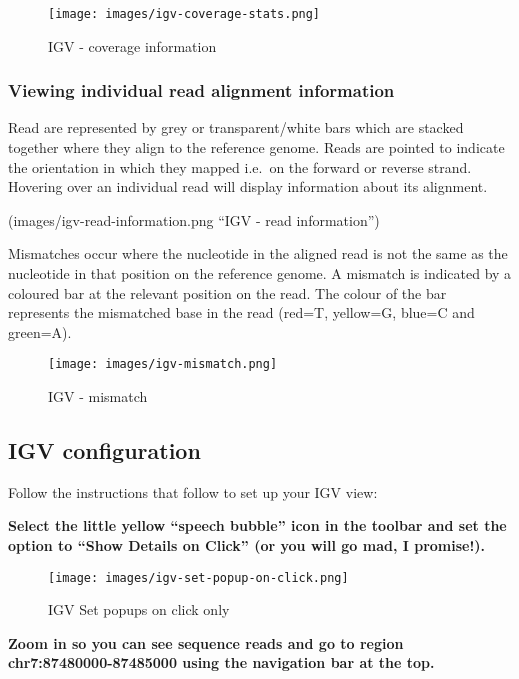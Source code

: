 \documentclass[11pt]{article}
\begin{document}
    \begin{figure}
\centering
\texttt{[image: images/igv-coverage-stats.png]}
\caption{IGV - coverage information}
\end{figure}

    \hypertarget{viewing-individual-read-alignment-information}{%
\subsubsection{Viewing individual read alignment
information}\label{viewing-individual-read-alignment-information}}

Read are represented by grey or transparent/white bars which are stacked
together where they align to the reference genome. Reads are pointed to
indicate the orientation in which they mapped i.e.~on the forward or
reverse strand. Hovering over an individual read will display
information about its alignment.

(images/igv-read-information.png ``IGV - read information'')

Mismatches occur where the nucleotide in the aligned read is not the
same as the nucleotide in that position on the reference genome. A
mismatch is indicated by a coloured bar at the relevant position on the
read. The colour of the bar represents the mismatched base in the read
(red=T, yellow=G, blue=C and green=A).

    \begin{figure}
\centering
\texttt{[image: images/igv-mismatch.png]}
\caption{IGV - mismatch}
\end{figure}

    \hypertarget{igv-configuration}{%
\subsection{IGV configuration}\label{igv-configuration}}

Follow the instructions that follow to set up your IGV view:

\textbf{Select the little yellow ``speech bubble'' icon in the toolbar
and set the option to ``Show Details on Click'' (or you will go mad, I
promise!).}

    \begin{figure}
\centering
\texttt{[image: images/igv-set-popup-on-click.png]}
\caption{IGV Set popups on click only}
\end{figure}

    \textbf{Zoom in so you can see sequence reads and go to region
chr7:87480000-87485000 using the navigation bar at the top.}
\end{document}
